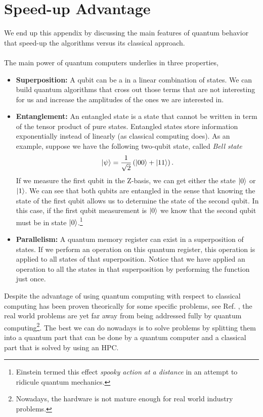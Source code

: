 \section{Speed-up Advantage}
We end up this appendix by discussing the main features of quantum behavior that speed-up the algorithms versus its classical approach.\\\\
The main power of quantum computers underlies in three properties,
\begin{itemize}
    \item \textbf{Superposition:} A qubit can be a in a linear combination of states. We can build quantum algorithms that cross out those terms that are not interesting for us and increase the amplitudes of the ones we are interested in.
    \item \textbf{Entanglement:} An entangled state is a state that cannot be written in term of the tensor product of pure states. Entangled states store information exponentially instead of linearly (as classical computing does). As an example, suppose we have the following two-qubit state, called \textit{Bell state}
\begin{equation}
    \ket{\psi} = \frac{1}{\sqrt{2}}\left(\ket{00} + \ket{11}\right).
\end{equation}
If we measure the first qubit in the Z-basis, we can get either the state $\ket{0}$ or $\ket{1}$. We can see that both qubits are entangled in the sense that knowing the state of the first qubit allows us to determine the state of the second qubit. In this case, if the first qubit measurement is $\ket{0}$ we know that the second qubit must be in state $\ket{0}$.\footnote{Einstein termed this effect \emph{spooky action at a distance} in an attempt to ridicule quantum mechanics.}  
    \item \textbf{Parallelism:} A quantum memory register can exist in a superposition of states. If we perform an operation on this quantum register, this operation is applied to all states of that superposition. Notice that we have applied an operation to all the states in that superposition by performing the function just once.
\end{itemize}
Despite the advantage of using quantum computing with respect to classical computing has been proven theorically for some specific problems, see Ref. \cite{Grover19961996Search}, the real world problems are yet far away from being addressed fully by quantum computing\footnote{Nowadays, the hardware is not mature enough for real world industry problems.}. The best we can do nowadays is to solve problems by splitting them into a quantum part that can be done by a quantum computer and a classical part that is solved by using an HPC.
